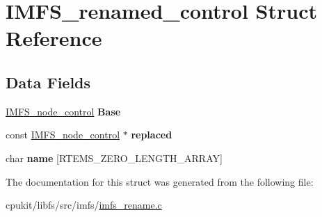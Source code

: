 \hypertarget{structIMFS__renamed__control}{}\section{I\+M\+F\+S\+\_\+renamed\+\_\+control Struct Reference}
\label{structIMFS__renamed__control}
\subsection*{Data Fields}
\begin{DoxyCompactItemize}
\item 
\mbox{\label{structIMFS__renamed__control_a7f9d3067d624f84252bed71c81bbf00f}} 
\mbox{\hyperlink{structIMFS__node__control}{I\+M\+F\+S\+\_\+node\+\_\+control}} {\bfseries Base}
\item 
\mbox{\label{structIMFS__renamed__control_afa74f4b73a494d5ca1a2d4a68fe895de}} 
const \mbox{\hyperlink{structIMFS__node__control}{I\+M\+F\+S\+\_\+node\+\_\+control}} $\ast$ {\bfseries replaced}
\item 
\mbox{\label{structIMFS__renamed__control_ae7c5460a16269cd483921a286266534a}} 
char {\bfseries name} \mbox{[}R\+T\+E\+M\+S\+\_\+\+Z\+E\+R\+O\+\_\+\+L\+E\+N\+G\+T\+H\+\_\+\+A\+R\+R\+AY\mbox{]}
\end{DoxyCompactItemize}


The documentation for this struct was generated from the following file\+:\begin{DoxyCompactItemize}
\item 
cpukit/libfs/src/imfs/\mbox{\hyperlink{imfs__rename_8c}{imfs\+\_\+rename.\+c}}\end{DoxyCompactItemize}

